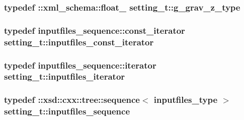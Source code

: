 \subsubsection[{\texorpdfstring{g\+\_\+grav\+\_\+z\+\_\+type}{g_grav_z_type}}]{\setlength{\rightskip}{0pt plus 5cm}typedef \+::{\bf xml\+\_\+schema\+::float\+\_\+} {\bf setting\+\_\+t\+::g\+\_\+grav\+\_\+z\+\_\+type}}\hypertarget{classsetting__t_a2a9e06e642160debeeadb7a76b97c753}{}\label{classsetting__t_a2a9e06e642160debeeadb7a76b97c753}
\subsubsection[{\texorpdfstring{inputfiles\+\_\+const\+\_\+iterator}{inputfiles_const_iterator}}]{\setlength{\rightskip}{0pt plus 5cm}typedef inputfiles\+\_\+sequence\+::const\+\_\+iterator {\bf setting\+\_\+t\+::inputfiles\+\_\+const\+\_\+iterator}}\hypertarget{classsetting__t_ae3c8f20640b10bda631423b7a7992d96}{}\label{classsetting__t_ae3c8f20640b10bda631423b7a7992d96}
\subsubsection[{\texorpdfstring{inputfiles\+\_\+iterator}{inputfiles_iterator}}]{\setlength{\rightskip}{0pt plus 5cm}typedef inputfiles\+\_\+sequence\+::iterator {\bf setting\+\_\+t\+::inputfiles\+\_\+iterator}}\hypertarget{classsetting__t_aba5818f4d041a7e5fd85bc8dbad26cf6}{}\label{classsetting__t_aba5818f4d041a7e5fd85bc8dbad26cf6}
\subsubsection[{\texorpdfstring{inputfiles\+\_\+sequence}{inputfiles_sequence}}]{\setlength{\rightskip}{0pt plus 5cm}typedef \+::xsd\+::cxx\+::tree\+::sequence$<$ {\bf inputfiles\+\_\+type} $>$ {\bf setting\+\_\+t\+::inputfiles\+\_\+sequence}}\hypertarget{classsetting__t_a7f069827c89edb95e2b4347f1484b7b3}{}\label{classsetting__t_a7f069827c89edb95e2b4347f1484b7b3}
